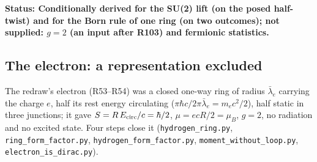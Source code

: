 \documentclass[11pt,a4paper]{article}
\theoremstyle{plain}
\theoremstyle{remark}
\newcommand{\lb}{\ensuremath{\bar\lambda_e}}
\newcommand{\status}[1]{\medskip\noindent\textbf{Status: #1.}\ }
\begin{document}
\status{Conditionally derived for the SU(2) lift (on the posed half-twist) and for the Born rule
of one ring (on two outcomes); not supplied: $g = 2$ (an input after R103) and fermionic
statistics}

\subsection{The electron: a representation excluded}\label{sec:electron}

The redraw's electron (R53--R54) was a closed one-way ring of radius $\lb$ carrying the charge $e$,
half its rest energy circulating ($\pi\hbar c/2\pi\lb = m_e c^2/2$), half static in three
junctions; it gave $S = R\,E_{\rm circ}/c = \hbar/2$, $\mu = ecR/2 = \mu_B$, $g = 2$, no
radiation and no excited state. Four steps close it (\texttt{hydrogen\_ring.py},
\texttt{ring\_form\_factor.py}, \texttt{hydrogen\_form\_factor.py}, \texttt{moment\_without\_loop.py},
\texttt{electron\_is\_dirac.py}).
\end{document}
